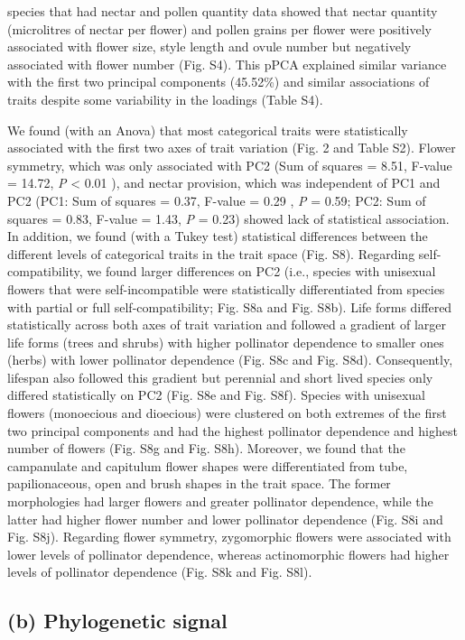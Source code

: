 \documentclass[
  12pt,
  a4paper,
]{article}
\begin{document}
species that had nectar and pollen quantity data showed that nectar quantity (microlitres of nectar per flower) and pollen grains per flower were positively associated with flower size, style length and ovule number but negatively associated with flower number (Fig. S4). This pPCA explained similar variance with the first two principal components (45.52\%) and similar associations of traits despite some variability in the loadings (Table S4).

We found (with an Anova) that most categorical traits were statistically associated with the first two axes of trait variation (Fig. 2 and Table S2). Flower symmetry, which was only associated with PC2 (Sum of squares = 8.51, F-value = 14.72, \emph{P} \textless{} 0.01 ), and nectar provision, which was independent of PC1 and PC2 (PC1: Sum of squares = 0.37, F-value = 0.29 , \emph{P} = 0.59; PC2: Sum of squares = 0.83, F-value = 1.43, \emph{P} = 0.23) showed lack of statistical association. In addition, we found (with a Tukey test) statistical differences between the different levels of categorical traits in the trait space (Fig. S8). Regarding self-compatibility, we found larger differences on PC2 (i.e., species with unisexual flowers that were self-incompatible were statistically differentiated from species with partial or full self-compatibility; Fig. S8a and Fig. S8b). Life forms differed statistically across both axes of trait variation and followed a gradient of larger life forms (trees and shrubs) with higher pollinator dependence to smaller ones (herbs) with lower pollinator dependence (Fig. S8c and Fig. S8d). Consequently, lifespan also followed this gradient but perennial and short lived species only differed statistically on PC2 (Fig. S8e and Fig. S8f). Species with unisexual flowers (monoecious and dioecious) were clustered on both extremes of the first two principal components and had the highest pollinator dependence and highest number of flowers (Fig. S8g and Fig. S8h). Moreover, we found that the campanulate and capitulum flower shapes were differentiated from tube, papilionaceous, open and brush shapes in the trait space. The former morphologies had larger flowers and greater pollinator dependence, while the latter had higher flower number and lower pollinator dependence (Fig. S8i and Fig. S8j). Regarding flower symmetry, zygomorphic flowers were associated with lower levels of pollinator dependence, whereas actinomorphic flowers had higher levels of pollinator dependence (Fig. S8k and Fig. S8l).

\hypertarget{b-phylogenetic-signal}{%
\subsection{(b) Phylogenetic signal}\label{b-phylogenetic-signal}}
\end{document}
